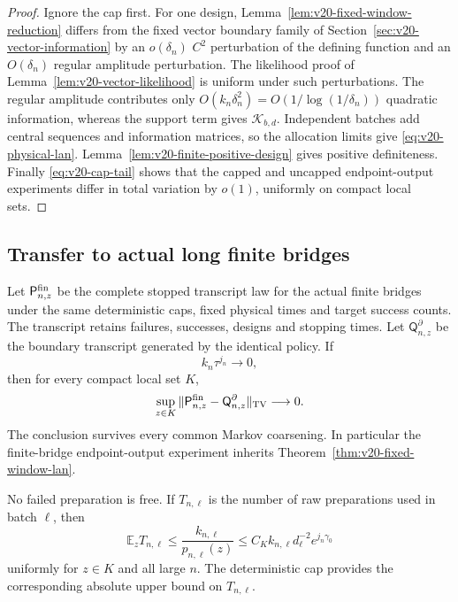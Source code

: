 \begin{proof}
Ignore the cap first.  For one design,
Lemma~\ref{lem:v20-fixed-window-reduction} differs from the fixed vector
boundary family of Section~\ref{sec:v20-vector-information} by an
$o(\delta_n)$ $C^2$ perturbation of the defining function and an
$O(\delta_n)$ regular amplitude perturbation.  The likelihood proof of
Lemma~\ref{lem:v20-vector-likelihood} is uniform under such perturbations.
The regular amplitude contributes only
$O(k_n\delta_n^2)=O(1/\log(1/\delta_n))$ quadratic information, whereas the
support term gives $\mathcal K_{b,d}$.  Independent batches add central
sequences and information matrices, so the allocation limits give
\eqref{eq:v20-physical-lan}.  Lemma~\ref{lem:v20-finite-positive-design}
gives positive definiteness.  Finally \eqref{eq:v20-cap-tail} shows that the
capped and uncapped endpoint-output experiments differ in total variation by
$o(1)$, uniformly on compact local sets.
\end{proof}

\subsection{Transfer to actual long finite bridges}

\begin{theorem}
\label{thm:v20-stopped-local-transfer}
Let $\mathsf P_{n,z}^{\rm fin}$ be the complete stopped transcript law for the
actual finite bridges under the same deterministic caps, fixed physical times
and target success counts.  The transcript retains failures, successes,
designs and stopping times.  Let $\mathsf Q_{n,z}^{\partial}$ be the boundary
transcript generated by the identical policy.  If
\begin{equation}\label{eq:v20-transfer-condition}
                         k_n\tau^{j_n}\to0,
\end{equation}
then for every compact local set $K$,
\begin{equation}\label{eq:v20-lecam-transfer}
 \sup_{z\in K}
 \|\mathsf P_{n,z}^{\rm fin}-\mathsf Q_{n,z}^{\partial}\|_{\rm TV}
 \longrightarrow0.
\end{equation}
The conclusion survives every common Markov coarsening.  In particular the
finite-bridge endpoint-output experiment inherits
Theorem~\ref{thm:v20-fixed-window-lan}.

No failed preparation is free.  If $T_{n,\ell}$ is the number of raw
preparations used in batch $\ell$, then
\begin{equation}\label{eq:v20-physical-cost}
 \mathbb E_zT_{n,\ell}
 \le \frac{k_{n,\ell}}{p_{n,\ell}(z)}
 \le C_K k_{n,\ell}d_\ell^{-2}e^{j_n\gamma_0}
\end{equation}
uniformly for $z\in K$ and all large $n$.  The deterministic cap provides the
corresponding absolute upper bound on $T_{n,\ell}$.
\end{theorem}


